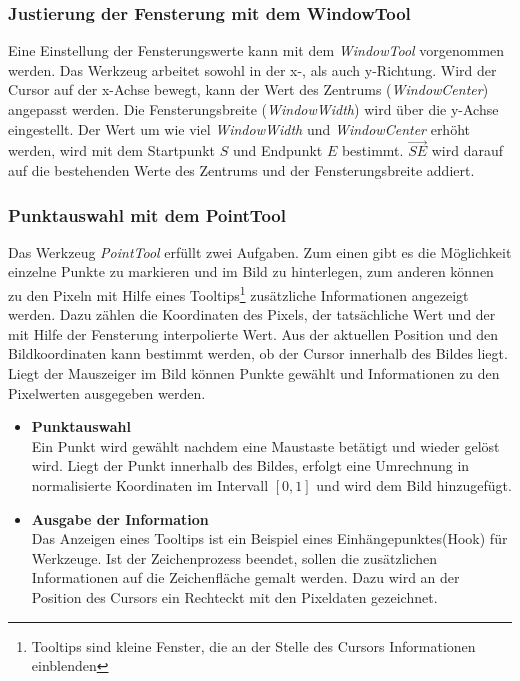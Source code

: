 \subsubsection{Justierung der Fensterung mit dem WindowTool}

Eine Einstellung der Fensterungswerte kann mit dem \textit{WindowTool} vorgenommen werden. Das Werkzeug arbeitet sowohl in der x-, als auch y-Richtung. Wird der Cursor auf der x-Achse bewegt, kann der Wert des Zentrums (\textit{WindowCenter}) angepasst werden. Die Fensterungsbreite (\textit{WindowWidth}) wird über die y-Achse eingestellt. Der Wert um wie viel \textit{WindowWidth} und \textit{WindowCenter} erhöht werden, wird mit dem Startpunkt $S$ und Endpunkt $E$ bestimmt. $\overrightarrow{SE}$ wird darauf auf die bestehenden Werte des Zentrums und der Fensterungsbreite addiert.

\subsubsection{Punktauswahl mit dem PointTool}

Das Werkzeug \textit{PointTool} erfüllt zwei Aufgaben. Zum einen gibt es die Möglichkeit einzelne Punkte zu markieren und im Bild zu hinterlegen, zum anderen können zu den Pixeln mit Hilfe eines Tooltips\footnote{Tooltips sind kleine Fenster, die an der Stelle des Cursors Informationen einblenden} zusätzliche Informationen angezeigt werden. Dazu zählen die Koordinaten des Pixels, der tatsächliche Wert und der mit Hilfe der Fensterung interpolierte Wert. Aus der aktuellen Position und den Bildkoordinaten kann bestimmt werden, ob der Cursor innerhalb des Bildes liegt. Liegt der Mauszeiger im Bild können Punkte gewählt und Informationen zu den Pixelwerten ausgegeben werden.
\begin{itemize}
\item \textbf{Punktauswahl}\\
	Ein Punkt wird gewählt nachdem eine Maustaste betätigt und wieder gelöst wird. Liegt der Punkt innerhalb des Bildes, erfolgt eine Umrechnung in normalisierte Koordinaten im Intervall $[0,1]$ und wird dem Bild hinzugefügt.
\item \textbf{Ausgabe der Information}\\
	Das Anzeigen eines Tooltips ist ein Beispiel eines Einhängepunktes(Hook) für Werkzeuge. Ist der Zeichenprozess beendet, sollen die zusätzlichen Informationen auf die Zeichenfläche gemalt werden.
	Dazu wird an der Position des Cursors ein Rechteckt mit den Pixeldaten gezeichnet.
\end{itemize}

